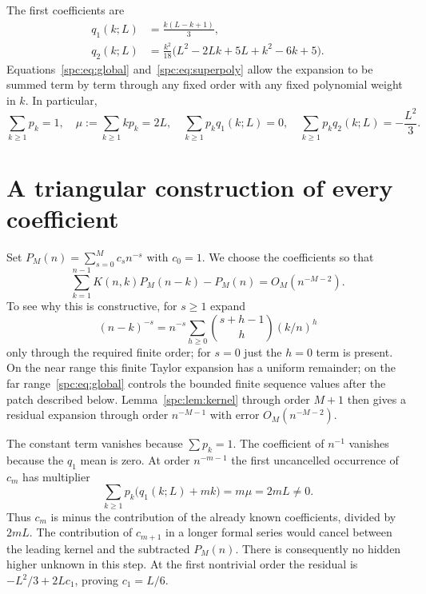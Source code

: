 \documentclass[11pt,letterpaper]{article}
\theoremstyle{definition}\newtheorem{definition}[theorem]{Definition}
\theoremstyle{remark}\newtheorem{remark}[theorem]{Remark}
\begin{document}
The first coefficients are
\begin{equation}\label{spc:eq:q12}
 \begin{split}
 q_1(k;L)&=\frac{k(L-k+1)}3,\\
 q_2(k;L)&=\frac{k^2}{18}\bigl(L^2-2Lk+5L+k^2-6k+5\bigr).
 \end{split}
\end{equation}
Equations~\eqref{spc:eq:global} and~\eqref{spc:eq:superpoly} allow the expansion to be summed term by term through any fixed order with any fixed polynomial weight in $k$. In particular,
\begin{equation}\label{spc:eq:moments}
 \sum_{k\ge1}p_k=1,\quad \mu:=\sum_{k\ge1}kp_k=2L,
 \quad\sum_{k\ge1}p_kq_1(k;L)=0,\quad
 \sum_{k\ge1}p_kq_2(k;L)=-\frac{L^2}3.
\end{equation}

\section{A triangular construction of every coefficient}\label{spc:sec:coefficients}
Set $P_M(n)=\sum_{s=0}^Mc_sn^{-s}$ with $c_0=1$. We choose the coefficients so that
\begin{equation}\label{spc:eq:residual}
 \sum_{k=1}^{n-1}K(n,k)P_M(n-k)-P_M(n)=O_M(n^{-M-2}).
\end{equation}
To see why this is constructive, for $s\ge1$ expand
\[
 (n-k)^{-s}=n^{-s}\sum_{h\ge0}\binom{s+h-1}{h}(k/n)^h
\]
only through the required finite order; for $s=0$ just the $h=0$ term is present. On the near range this finite Taylor expansion has a uniform remainder; on the far range~\eqref{spc:eq:global} controls the bounded finite sequence values after the patch described below. Lemma~\ref{spc:lem:kernel} through order $M+1$ then gives a residual expansion through order $n^{-M-1}$ with error $O_M(n^{-M-2})$.

The constant term vanishes because $\sum p_k=1$. The coefficient of $n^{-1}$ vanishes because the $q_1$ mean is zero. At order $n^{-m-1}$ the first uncancelled occurrence of $c_m$ has multiplier
\begin{equation}\label{spc:eq:triangular}
 \sum_{k\ge1}p_k\bigl(q_1(k;L)+mk\bigr)=m\mu=2mL\ne0.
\end{equation}
Thus $c_m$ is minus the contribution of the already known coefficients, divided by $2mL$. The contribution of $c_{m+1}$ in a longer formal series would cancel between the leading kernel and the subtracted $P_M(n)$. There is consequently no hidden higher unknown in this step. At the first nontrivial order the residual is $-L^2/3+2Lc_1$, proving $c_1=L/6$.
\end{document}
